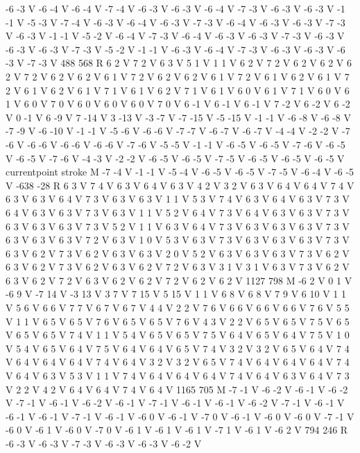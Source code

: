 {-6 -3 V
-6 -4 V
-6 -4 V
-7 -4 V
-6 -3 V
-6 -3 V
-6 -4 V
-7 -3 V
-6 -3 V
-6 -3 V
-1 -1 V
-5 -3 V
-7 -4 V
-6 -3 V
-6 -4 V
-6 -3 V
-7 -3 V
-6 -4 V
-6 -3 V
-6 -3 V
-7 -3 V
-6 -3 V
-1 -1 V
-5 -2 V
-6 -4 V
-7 -3 V
-6 -4 V
-6 -3 V
-6 -3 V
-7 -3 V
-6 -3 V
-6 -3 V
-6 -3 V
-7 -3 V
-5 -2 V
-1 -1 V
-6 -3 V
-6 -4 V
-7 -3 V
-6 -3 V
-6 -3 V
-6 -3 V
-7 -3 V
488 568 R
6 2 V
7 2 V
6 3 V
5 1 V
1 1 V
6 2 V
7 2 V
6 2 V
6 2 V
6 2 V
7 2 V
6 2 V
6 2 V
6 1 V
7 2 V
6 2 V
6 2 V
6 1 V
7 2 V
6 1 V
6 2 V
6 1 V
7 2 V
6 1 V
6 2 V
6 1 V
7 1 V
6 1 V
6 2 V
7 1 V
6 1 V
6 0 V
6 1 V
7 1 V
6 0 V
6 1 V
6 0 V
7 0 V
6 0 V
6 0 V
6 0 V
7 0 V
6 -1 V
6 -1 V
6 -1 V
7 -2 V
6 -2 V
6 -2 V
0 -1 V
6 -9 V
7 -14 V
3 -13 V
-3 -7 V
-7 -15 V
-5 -15 V
-1 -1 V
-6 -8 V
-6 -8 V
-7 -9 V
-6 -10 V
-1 -1 V
-5 -6 V
-6 -6 V
-7 -7 V
-6 -7 V
-6 -7 V
-4 -4 V
-2 -2 V
-7 -6 V
-6 -6 V
-6 -6 V
-6 -6 V
-7 -6 V
-5 -5 V
-1 -1 V
-6 -5 V
-6 -5 V
-7 -6 V
-6 -5 V
-6 -5 V
-7 -6 V
-4 -3 V
-2 -2 V
-6 -5 V
-6 -5 V
-7 -5 V
-6 -5 V
-6 -5 V
-6 -5 V
currentpoint stroke M
-7 -4 V
-1 -1 V
-5 -4 V
-6 -5 V
-6 -5 V
-7 -5 V
-6 -4 V
-6 -5 V
-638 -28 R
6 3 V
7 4 V
6 3 V
6 4 V
6 3 V
4 2 V
3 2 V
6 3 V
6 4 V
6 4 V
7 4 V
6 3 V
6 3 V
6 4 V
7 3 V
6 3 V
6 3 V
1 1 V
5 3 V
7 4 V
6 3 V
6 4 V
6 3 V
7 3 V
6 4 V
6 3 V
6 3 V
7 3 V
6 3 V
1 1 V
5 2 V
6 4 V
7 3 V
6 4 V
6 3 V
6 3 V
7 3 V
6 3 V
6 3 V
6 3 V
7 3 V
5 2 V
1 1 V
6 3 V
6 4 V
7 3 V
6 3 V
6 3 V
6 3 V
7 3 V
6 3 V
6 3 V
6 3 V
7 2 V
6 3 V
1 0 V
5 3 V
6 3 V
7 3 V
6 3 V
6 3 V
6 3 V
7 3 V
6 3 V
6 2 V
7 3 V
6 2 V
6 3 V
6 3 V
2 0 V
5 2 V
6 3 V
6 3 V
6 3 V
7 3 V
6 2 V
6 3 V
6 2 V
7 3 V
6 2 V
6 3 V
6 2 V
7 2 V
6 3 V
3 1 V
3 1 V
6 3 V
7 3 V
6 2 V
6 3 V
6 2 V
7 2 V
6 3 V
6 2 V
6 2 V
7 2 V
6 2 V
6 2 V
1127 798 M
-6 2 V
0 1 V
-6 9 V
-7 14 V
-3 13 V
3 7 V
7 15 V
5 15 V
1 1 V
6 8 V
6 8 V
7 9 V
6 10 V
1 1 V
5 6 V
6 6 V
7 7 V
6 7 V
6 7 V
4 4 V
2 2 V
7 6 V
6 6 V
6 6 V
6 6 V
7 6 V
5 5 V
1 1 V
6 5 V
6 5 V
7 6 V
6 5 V
6 5 V
7 6 V
4 3 V
2 2 V
6 5 V
6 5 V
7 5 V
6 5 V
6 5 V
6 5 V
7 4 V
1 1 V
5 4 V
6 5 V
6 5 V
7 5 V
6 4 V
6 5 V
6 4 V
7 5 V
1 0 V
5 4 V
6 5 V
6 4 V
7 5 V
6 4 V
6 4 V
6 5 V
7 4 V
3 2 V
3 2 V
6 5 V
6 4 V
7 4 V
6 4 V
6 4 V
6 4 V
7 4 V
6 4 V
3 2 V
3 2 V
6 5 V
7 4 V
6 4 V
6 4 V
6 4 V
7 4 V
6 4 V
6 3 V
5 3 V
1 1 V
7 4 V
6 4 V
6 4 V
6 4 V
7 4 V
6 4 V
6 3 V
6 4 V
7 3 V
2 2 V
4 2 V
6 4 V
6 4 V
7 4 V
6 4 V
1165 705 M
-7 -1 V
-6 -2 V
-6 -1 V
-6 -2 V
-7 -1 V
-6 -1 V
-6 -2 V
-6 -1 V
-7 -1 V
-6 -1 V
-6 -1 V
-6 -2 V
-7 -1 V
-6 -1 V
-6 -1 V
-6 -1 V
-7 -1 V
-6 -1 V
-6 0 V
-6 -1 V
-7 0 V
-6 -1 V
-6 0 V
-6 0 V
-7 -1 V
-6 0 V
-6 1 V
-6 0 V
-7 0 V
-6 1 V
-6 1 V
-6 1 V
-7 1 V
-6 1 V
-6 2 V
794 246 R
-6 -3 V
-6 -3 V
-7 -3 V
-6 -3 V
-6 -3 V
-6 -2 V
}
